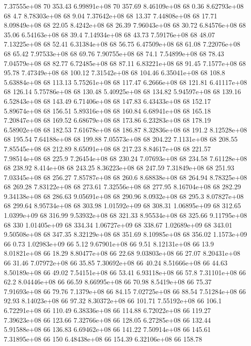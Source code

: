 7.37555e+08 70 353.43
6.99891e+08 70 357.69
8.46109e+08 68 0.36
8.62793e+08 68 4.7
8.78303e+08 68 9.04
7.37642e+08 68 13.37
7.44808e+08 68 17.71
8.09849e+08 68 22.05
8.4242e+08 68 26.39
7.96043e+08 68 30.72
6.84576e+08 68 35.06
6.54163e+08 68 39.4
7.14934e+08 68 43.73
7.59176e+08 68 48.07
7.13225e+08 68 52.41
6.31384e+08 68 56.75
6.47509e+08 68 61.08
7.22076e+08 68 65.42
7.97533e+08 68 69.76
7.90755e+08 68 74.1
7.54899e+08 68 78.43
7.04579e+08 68 82.77
6.72485e+08 68 87.11
6.83221e+08 68 91.45
7.1577e+08 68 95.78
7.47349e+08 68 100.12
7.31542e+08 68 104.46
6.35041e+08 68 108.8
5.63884e+08 68 113.13
5.75261e+08 68 117.47
6.2666e+08 68 121.81
6.41117e+08 68 126.14
5.75786e+08 68 130.48
5.40925e+08 68 134.82
5.94597e+08 68 139.16
6.52843e+08 68 143.49
6.71406e+08 68 147.83
6.43433e+08 68 152.17
5.89674e+08 68 156.51
5.89316e+08 68 160.84
6.68941e+08 68 165.18
7.20847e+08 68 169.52
6.68679e+08 68 173.86
6.23283e+08 68 178.19
6.58902e+08 68 182.53
7.61678e+08 68 186.87
8.32836e+08 68 191.2
8.12528e+08 68 195.54
7.64188e+08 68 199.88
7.05573e+08 68 204.22
7.1131e+08 68 208.55
7.85545e+08 68 212.89
8.65091e+08 68 217.23
8.84617e+08 68 221.57
7.98514e+08 68 225.9
7.26454e+08 68 230.24
7.07693e+08 68 234.58
7.61128e+08 68 238.92
8.414e+08 68 243.25
8.36223e+08 68 247.59
7.31849e+08 68 251.93
7.03345e+08 68 256.27
7.85787e+08 68 260.6
8.68838e+08 68 264.94
8.78325e+08 68 269.28
7.83122e+08 68 273.61
7.32556e+08 68 277.95
8.16704e+08 68 282.29
9.34138e+08 68 286.63
9.05691e+08 68 290.96
8.0932e+08 68 295.3
8.07827e+08 68 299.64
8.95734e+08 68 303.98
1.01592e+09 68 308.31
1.06895e+09 68 312.65
1.0399e+09 68 316.99
9.53932e+08 68 321.33
8.95534e+08 68 325.66
9.11795e+08 68 330
1.01405e+09 68 334.34
1.06727e+09 68 338.67
1.02689e+09 68 343.01
9.50508e+08 68 347.35
8.32129e+08 68 351.69
8.10985e+08 68 356.02
1.1573e+09 66 0.73
1.02983e+09 66 5.12
9.67901e+08 66 9.51
8.12131e+08 66 13.9
8.01821e+08 66 18.29
8.80477e+08 66 22.68
9.03803e+08 66 27.07
8.20431e+08 66 31.46
7.07972e+08 66 35.85
7.30692e+08 66 40.24
8.51666e+08 66 44.63
8.50189e+08 66 49.02
7.54151e+08 66 53.41
6.93118e+08 66 57.8
7.31101e+08 66 62.2
8.04446e+08 66 66.59
8.66995e+08 66 70.98
8.5419e+08 66 75.37
7.91693e+08 66 79.76
7.1379e+08 66 84.15
7.02725e+08 66 88.54
7.51284e+08 66 92.93
8.14023e+08 66 97.32
8.30372e+08 66 101.71
7.55192e+08 66 106.1
6.72291e+08 66 110.49
6.38336e+08 66 114.88
6.72022e+08 66 119.27
7.39623e+08 66 123.66
7.32766e+08 66 128.05
6.27285e+08 66 132.44
5.91588e+08 66 136.83
6.69462e+08 66 141.22
7.50914e+08 66 145.61
7.31895e+08 66 150
6.48438e+08 66 154.39
6.32106e+08 66 158.78
